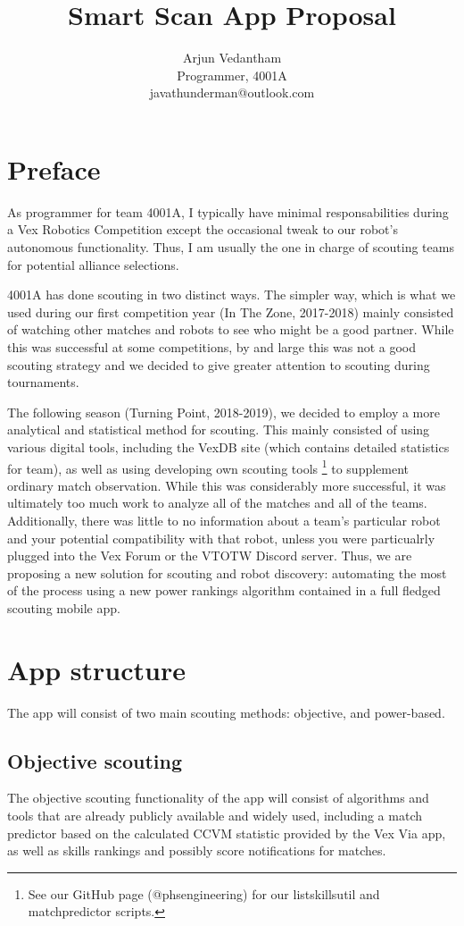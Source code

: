 \documentclass[11pt]{article}
\title{\textbf{Smart Scan App Proposal}}
\author{Arjun Vedantham\\ Programmer, 4001A\\javathunderman@outlook.com}
\date{}
\begin{document}
\maketitle

\section{Preface}

As programmer for team 4001A, I typically have minimal responsabilities during a Vex Robotics Competition except the occasional tweak to our robot's autonomous functionality. Thus, I am usually the one in charge of scouting teams for potential alliance selections. 

4001A has done scouting in two distinct ways. The simpler way, which is what we used during our first competition year (In The Zone, 2017-2018) mainly consisted of watching other matches and robots to see who might be a good partner. While this was successful at some competitions, by and large this was not a good scouting strategy and we decided to give greater attention to scouting during tournaments. 

The following season (Turning Point, 2018-2019), we decided to employ a more analytical and statistical method for scouting. This mainly consisted of using various digital tools, including the VexDB site (which contains detailed statistics for team), as well as using developing own scouting tools \footnote{See our GitHub page (@phsengineering) for our listskillsutil and matchpredictor scripts.} to supplement ordinary match observation. While this was considerably more successful, it was ultimately too much work to analyze all of the matches and all of the teams. Additionally, there was little to no information about a team's particular robot and your potential compatibility with that robot, unless you were particualrly plugged into the Vex Forum or the VTOTW Discord server. Thus, we are proposing a new solution for scouting and robot discovery: automating the most of the process using a new power rankings algorithm contained in a full fledged scouting mobile app. 

\section{App structure}
The app will consist of two main scouting methods: objective, and power-based. 
\subsection{Objective scouting}
The objective scouting functionality of the app will consist of algorithms and tools that are already publicly available and widely used, including a match predictor based on the calculated CCVM statistic provided by the Vex Via app, as well as skills rankings and possibly score notifications for matches. 
\end{document}

